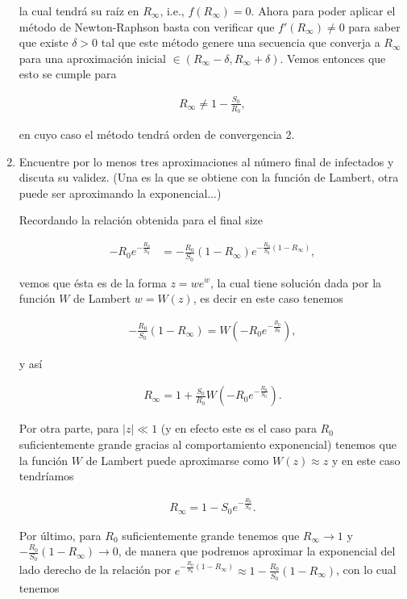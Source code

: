 \documentclass[answers]{exam}
\begin{document}
\begin{questions}
\begin{enumerate}
\begin{solution}
la cual tendrá su raíz en $R_\infty$, i.e., $f(R_\infty) = 0$. Ahora para poder aplicar el método de Newton-Raphson basta con verificar que $f'(R_\infty) \neq 0$ para saber que existe $\delta > 0$ tal que este método genere una secuencia que converja a $R_\infty$ para una aproximación inicial $\in (R_\infty - \delta, R_\infty + \delta)$. Vemos entonces que esto se cumple para

\begin{align*}
    R_\infty \neq 1 - \frac{S_0}{R_0},
\end{align*}

en cuyo caso el método tendrá orden de convergencia 2.
\end{solution}

\item Encuentre por lo menos tres aproximaciones al n\'umero final de infectados y discuta su validez. (Una es la que se obtiene con la funci\'on de Lambert, otra puede ser aproximando la exponencial...)

\begin{solution}
Recordando la relación obtenida para el final size

\begin{align*}
    -R_0e^{-\frac{R_0}{S_0}} &= -\frac{R_0}{S_0}(1 - R_\infty)e^{-\frac{R_0}{S_0}(1 - R_\infty)},
\end{align*}

vemos que ésta es de la forma $z = we^w$, la cual tiene solución dada por la función $W$ de Lambert $w = W(z)$, es decir en este caso tenemos

\begin{align*}
    -\frac{R_0}{S_0}(1 - R_\infty) = W(-R_0e^{-\frac{R_0}{S_0}}),
\end{align*}

y así

\begin{align*}
    R_\infty = 1 + \frac{S_0}{R_0}W(-R_0e^{-\frac{R_0}{S_0}}).
\end{align*}

Por otra parte, para $|z| \ll 1$ (y en efecto este es el caso para $R_0$ suficientemente grande gracias al comportamiento exponencial) tenemos que la función $W$ de Lambert puede aproximarse como $W(z) \approx z$ y en este caso tendríamos

\begin{align*}
    R_\infty = 1 - S_0e^{-\frac{R_0}{S_0}}.
\end{align*}

Por último, para $R_0$ suficientemente grande tenemos que $R_\infty \to 1$ y $-\frac{R_0}{S_0}(1 - R_\infty) \to 0$, de manera que podremos aproximar la exponencial del lado derecho de la relación por $e^{-\frac{R_0}{S_0}(1 - R_\infty)} \approx 1 - \frac{R_0}{S_0}(1 - R_\infty)$, con lo cual tenemos


\end{solution}
\end{enumerate}
\end{questions}
\end{document}
